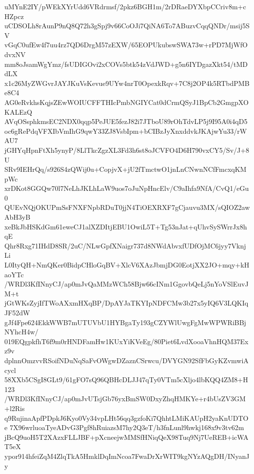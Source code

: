 uMYnE2IY/pWEkXYrUdd6VRdrmsf/2pkz6BGH1m/2rDRaeDYXbpCCriv8m+cHZpcz
uCDSOLh8rAunP9nQ8Q72h3gSpj9v66CoOJi7QiNA6To7ABuzvCqqQNDr/msij5SV
vGqC0ufEw4f7uu4rz7QD6DrgM57zEXW/65EOPUkubswSWA73w+rPD7MjWfOdvxNV
mm8oJsamWgYmz/fsUDIGOvi2xCOVs5btk54zVdJWD+g5n6IYDgazXkt54/tMDdLX
x1c26MyZWGvrJAYJKuVsKevue9UYw4nrT0OpexkRqv+7C8j2OP4k5RTbdPMBe8C4
AG0eRvkhsKqjsZEwWOIUCFFTHIcPmbNGIYCat0dCrmQSyJ1BpCb2GmgpXOKALEzQ
AVqOSsphkmsEC2NDX0qqp5PeJUE5fezJ82i7JTboU89rOhTdvLP5j9I95A0i4qD5
oc6gRePdqVFXIbVmIhG9qwY33ZJ8VsbIpm+bCIBzJyXnxddvkJKAjwYu33/rWAU7
jGHYqHpnFtXh5ynyP/8LlTkcZgzXL3Fd3h6st8oJCVFO4D6H790vxCY5/Sv/J+8U
SRv9IEHrQq/s926S4zQWij0u+CopjvX+jU2fTmctwO1jnLnCNwnNCfFmcxqKMpWc
xrDKot8GGQw70l7NeLhJKLhLaW9uos7oJuNpHncElv/C9aIhfa9NfA/CvQ1/eGu0
QUEvNQjOKUPmSsFNXFNpbRDuT0jjN4TiOEXRXF7gCjauvu3MX/sQIOZ2awAbH3yB
xeBkJbHSKdGm61eweCJ1alXZDItjEBU1OwiL5T+Tg53nJat+qUhvSySWrrJx8hqE
Qhr8Rxg71IHdD8SR/2uC/NLwGpfXNaigr737d8NWdAbvxfUDfOjMC6jyy7VknjLi
L0ItyQH+NmQKer0BidpCHloGqBV+XlcV6XAzJbmjDG0EotjXX2JO+mqy+kHaoYTc
/WRDl3KfINnyCJ/ap0mJvQaMMzWCh58Bjw66cINm1GgovbQeLj5nYoVSlEuvJM+t
jGtWKsZyjIfTWoAXxmHXqBP/DpAYJaTKYIpNDFCMw3b27x5yIQ6V3LQKIqJF52dW
gJf4Fpe624EkkWWB7mUTUVbU1HYBgaTy193gCZYWlUwgFgMwWPWRiBBjNYhcH4w/
019EQgpkfhT6f9m0rHNDFamHw1KUxYiKVeEg/80Piet6LvdXooaVhnHQM37Exz9v
dplnnOmzvvRSoifNDuNqSaFvOWgwDZaznCSrwcu/DVYGN92SfFbGyKZvmwiAcycl
58XXb5CSgI8GLt9/61gFO7sQ96QBHcDLJJ47qTy0VTm5cXljo4lbKQQ4ZM8+H123
/WRDl3KfINnyCJ/ap0mJvUTsjGb76yxBmSW0DxyZhqHMKYe+r4bUsZV3GM+l2Ris
q9RujinaApfPDpkJ6Kyo0Vy34vpLHt56qq3gzfoKi7QhhtLMiKAUpH2yaKnUDTOe
7X96wrluoaTyeADvG3Pgf8hRuiazsM7hy2Q3eT/h3fnLunl9hwkj168x9v3tv62m
jBcQ9uoH5T2XAzxFLLJBF+pXcneejwMMSfHNiqQeX98Tuq9Nj7UeREB+icWAT5eX
ypor914hfeiZqM4ZlqTkA5HmklDqImNcoa7FwaDrXrWIT9kgNYzAQgDH/INyanJy
